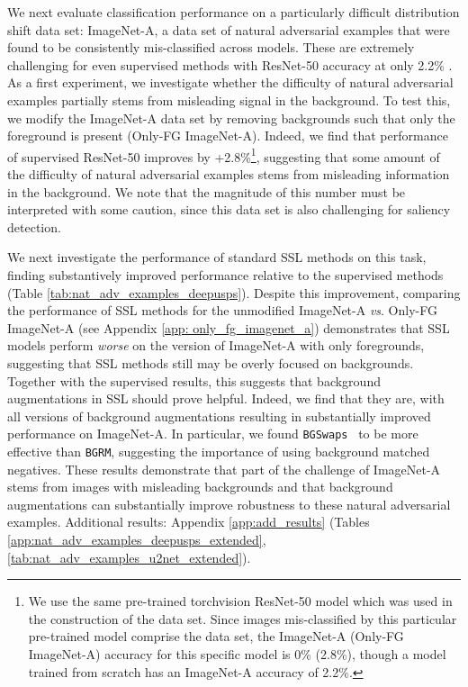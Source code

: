 \documentclass[twoside,11pt]{article}
\newcommand{\bgrm}{\texttt{BG\textunderscore RM}}
\newcommand{\bgswaps}{\texttt{BG\textunderscore Swaps}}
\begin{document}
We next evaluate classification performance on a particularly difficult distribution shift data set: ImageNet-A, a data set of natural adversarial examples that were found to be consistently mis-classified across models. These are extremely challenging for even supervised methods with ResNet-50 accuracy at only 2.2\% \citep{hendrycks2019nae}. As a first experiment, we investigate whether the difficulty of natural adversarial examples partially stems from misleading signal in the background. To test this, we modify the ImageNet-A data set by removing backgrounds such that only the foreground is present (Only-FG ImageNet-A). Indeed, we find that performance of supervised ResNet-50 improves by +2.8\%\footnote{We use the same pre-trained torchvision ResNet-50 model which was used in the construction of the data set. Since images mis-classified by this particular pre-trained model comprise the data set, the ImageNet-A (Only-FG ImageNet-A) accuracy for this specific model is 0\% (2.8\%), though a model trained from scratch has an ImageNet-A accuracy of 2.2\%.}, suggesting that some amount of the difficulty of natural adversarial examples stems from misleading information in the background. We note that the magnitude of this number must be interpreted with some caution, since this data set is also challenging for saliency detection. 


We next investigate the performance of standard SSL methods on this task, finding substantively improved performance relative to the supervised methods (Table \ref{tab:nat_adv_examples_deepusps}). Despite this improvement, comparing the performance of SSL methods for the unmodified ImageNet-A \textit{vs}. Only-FG ImageNet-A (see Appendix \ref{app: only_fg_imagenet_a}) demonstrates that SSL models perform \textit{worse} on the version of ImageNet-A with only foregrounds, suggesting that SSL methods still may be overly focused on backgrounds. Together with the supervised results, this suggests that background augmentations in SSL should prove helpful. Indeed, we find that they are, with all versions of background augmentations resulting in substantially improved performance on ImageNet-A. In particular, we found \bgswaps~ to be more effective than \bgrm, suggesting the importance of using background matched negatives. These results demonstrate that part of the challenge of ImageNet-A stems from images with misleading backgrounds and that background augmentations can substantially improve robustness to these natural adversarial examples. Additional results: Appendix \ref{app:add_results} (Tables \ref{app:nat_adv_examples_deepusps_extended}, \ref{tab:nat_adv_examples_u2net_extended}). 
\end{document}
